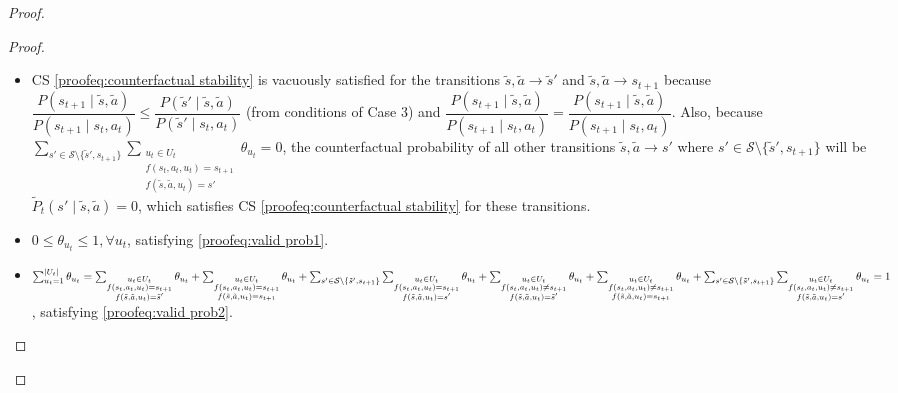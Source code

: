 \begin{proof}
\begin{proof}
\begin{itemize}
    \item CS \eqref{proofeq:counterfactual stability} is vacuously satisfied for the transitions $\tilde{s}, \tilde{a} \rightarrow \tilde{s}'$ and $\tilde{s}, \tilde{a} \rightarrow s_{t+1}$ because \\$\dfrac{P(s_{t+1} \mid \tilde{s}, \tilde{a})}{P(s_{t+1} \mid s_t, a_t)}\leq\dfrac{P(\tilde{s}' \mid \tilde{s}, \tilde{a})}{P(\tilde{s}' \mid s_t, a_t)}$ (from conditions of Case 3) and $\dfrac{P(s_{t+1} \mid \tilde{s}, \tilde{a})}{P(s_{t+1} \mid s_t, a_t)} = \dfrac{P(s_{t+1} \mid \tilde{s}, \tilde{a})}{P(s_{t+1} \mid s_t, a_t)}$. Also, because $\sum_{s' \in \mathcal{S}\setminus\{\tilde{s}', s_{t+1}\}}\sum_{\substack{u_t \in U_t \\f(s_t, a_t, u_t) = s_{t+1} \\ f(\tilde{s}, \tilde{a}, u_t) = s'}}{\theta_{u_t}} = 0$, the counterfactual probability of all other transitions $\tilde{s}, \tilde{a} \rightarrow s'$ where $s' \in \mathcal{S}\setminus\{\tilde{s}', s_{t+1}\}$ will be $\tilde{P}_t(s' \mid \tilde{s}, \tilde{a}) = 0$, which satisfies CS \eqref{proofeq:counterfactual stability} for these transitions.

    \item $0 \leq \theta_{u_t} \leq 1, \forall u_t$, satisfying \eqref{proofeq:valid prob1}.
    
    \item $\sum_{u_t = 1}^{|U_t|} \theta_{u_t} = \sum_{\substack{u_t \in U_t \\f(s_t, a_t, u_t) = s_{t+1} \\ f(\tilde{s}, \tilde{a}, u_t) = \tilde{s}'}} \theta_{u_t} + \sum_{\substack{u_t \in U_t \\f(s_t, a_t, u_t) = s_{t+1} \\ f(\tilde{s}, \tilde{a}, u_t) = s_{t+1}}} \theta_{u_t} +  \sum_{s' \in \mathcal{S}\setminus\{\tilde{s}', s_{t+1}\}}\sum_{\substack{u_t \in U_t \\f(s_t, a_t, u_t) = s_{t+1} \\ f(\tilde{s}, \tilde{a}, u_t) = s'}}{\theta_{u_t}} \\+ \sum_{\substack{u_t \in U_t \\f(s_t, a_t, u_t) \neq s_{t+1} \\ f(\tilde{s}, \tilde{a}, u_t) = \tilde{s}'}} \theta_{u_t} + 
    \sum_{\substack{u_t \in U_t \\f(s_t, a_t, u_t) \neq s_{t+1} \\ f(\tilde{s}, \tilde{a}, u_t) = s_{t+1}}} \theta_{u_t} + \sum_{s' \in \mathcal{S}\setminus\{\tilde{s}', s_{t+1}\}}\sum_{\substack{u_t \in U_t \\f(s_t, a_t, u_t) \neq s_{t+1} \\ f(\tilde{s}, \tilde{a}, u_t) = s'}}{\theta_{u_t}} = 1$, satisfying \eqref{proofeq:valid prob2}.
\end{itemize}


\end{proof}
\end{proof}
